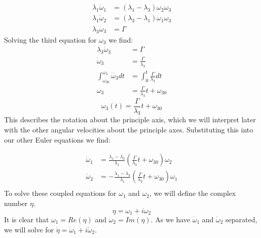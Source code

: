 \documentclass{article}
\begin{document}
\begin{align*}
    \lambda_1 \dot{\omega}_1 &= (\lambda_1-\lambda_3)\omega_2 \omega_3 \\
    \lambda_1 \dot{\omega}_2 &= (\lambda_3-\lambda_1)\omega_1 \omega_3 \\
    \lambda_3 \dot{\omega}_3 &= \Gamma
\end{align*}
Solving the third equation for $\omega_3$ we find: 
\begin{align*}
    \lambda_3 \dot{\omega}_3 &= \Gamma \\
    \dot{\omega}_3 &= \frac{\Gamma }{\lambda_3} \\
    \int_{\omega_{30}}^{\omega_3}\dot{\omega}_3 dt &= \int_0^t{\frac{\Gamma }{\lambda_3}}dt \\
    \omega_3 &= \frac{\Gamma }{\lambda_3}t + \omega_{30}
\end{align*}
$$\boxed{\omega_3(t) = \frac{\Gamma }{\lambda_3}t + \omega_{30}}$$
This describes the rotation about the principle axis, which we will interpret later with the other angular velocities about the principle axes. Substituting this into our other Euler equations we find:

\begin{align*}
    \dot{\omega}_1 &= \frac{\lambda_1-\lambda_3}{\lambda_1}\left( \frac{\Gamma }{\lambda_3}t + \omega_{30} \right) \omega_2 \\
    \dot{\omega}_2 &= -\frac{\lambda_1-\lambda_3}{\lambda_1}\left( \frac{\Gamma }{\lambda_3}t + \omega_{30} \right) \omega_1 \\
\end{align*}
To solve these coupled equations for $\omega_1$ and $\omega_2$, we will define the complex number $\eta$.
$$\eta = \omega_1 + i\omega_2$$
It is clear that $\omega_1 = Re(\eta)$ and $\omega_2 = Im(\eta)$. As we have $\dot{\omega}_1$ and $\dot{\omega}_2$ separated, we will solve for $\dot{\eta} = \dot{\omega}_1 + i\dot{\omega}_2$. 
\end{document}
